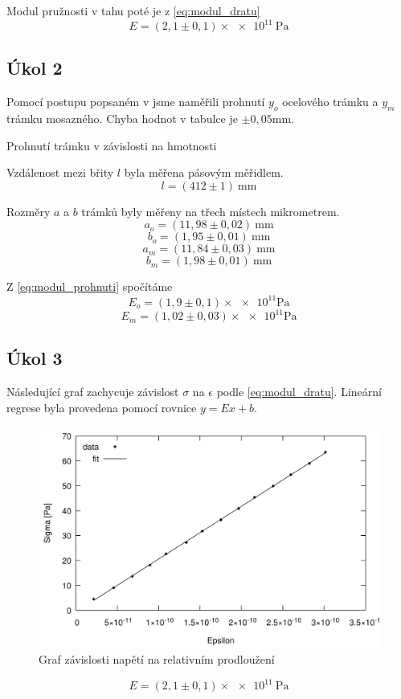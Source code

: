 \documentclass[protokol.tex]{subfiles}
\begin{document}
Modul pružnosti v tahu poté je z \eqref{eq:modul_dratu} 
$$ E = (2,1 \pm 0,1) \times \num{e11} \ \si{\pascal} $$

\newpage

\subsection*{Úkol 2}
Pomocí postupu popsaném v \cite{stud_text} jsme naměřili prohnutí $y_o$ ocelového trámku a $y_m$ trámku mosazného. Chyba hodnot v tabulce je $\pm 0,05 \si{\milli\metre}$.

\begin{table}[H] \label{tab:prohnuti}
\centering
\setlength{\tabcolsep}{10pt}

\caption{Prohnutí trámku v závislosti na hmotnosti}
\end{table}

Vzdálenost mezi břity $l$ byla měřena pásovým měřidlem.
$$ l = (412 \pm 1) \ \si{\milli\metre} $$

Rozměry $a$ a $b$ trámků byly měřeny na třech místech mikrometrem.
$$ a_o = (11,98 \pm 0,02) \ \si{\milli\metre} $$
$$ b_o = (1,95  \pm 0,01) \ \si{\milli\metre} $$
$$ a_m = (11,84 \pm 0,03) \ \si{\milli\metre} $$
$$ b_m = (1,98  \pm 0,01) \ \si{\milli\metre} $$

Z \eqref{eq:modul_prohnuti} spočítáme
$$ E_o = (1,9 \pm 0,1) \times \num{e11} \si{\pascal} $$
$$ E_m = (1,02 \pm 0,03) \times \num{e11} \si{\pascal} $$

\newpage

\subsection*{Úkol 3}
Následující graf zachycuje závislost $\sigma$ na $\epsilon$ podle \eqref{eq:modul_dratu}. Lineární regrese byla provedena pomocí rovnice $y = Ex + b$.
\begin{figure}[H]
\centering
\includegraphics[resolution=350]{plot/drat}
\caption{Graf závislosti napětí na relativním prodloužení}
\end{figure}

$$ E = (2,1 \pm 0,1) \times \num{e11} \ \si{\pascal} $$
\end{document}
